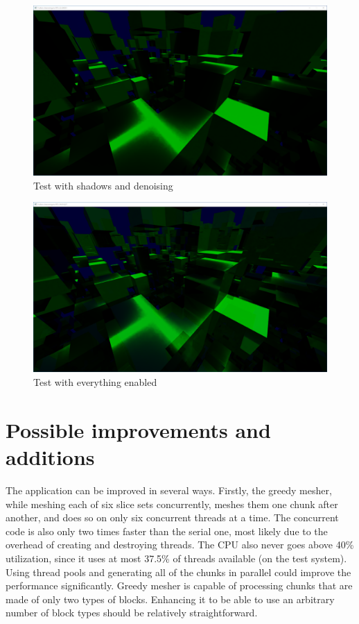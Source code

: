 \documentclass[times, utf8, zavrsni, numeric]{fer}
\begin{document}
\begin{center}
\begin{figure}[H]
\includegraphics[width=1\textwidth]{tests/shadows+denoising.png}
\caption{Test with shadows and denoising}
\end{figure}
\end{center}

\begin{center}
\begin{figure}[H]
\includegraphics[width=1\textwidth]{tests/all_on.png}
\caption{Test with everything enabled}
\label{image:all_on}
\end{figure}
\end{center}

\section{Possible improvements and additions}
The application can be improved in several ways. Firstly, the greedy mesher, while meshing each of six slice sets concurrently, meshes them one chunk after another, and does so on only six concurrent threads at a time. The concurrent code is also only two times faster than the serial one, most likely due to the overhead of creating and destroying threads. The CPU also never goes above 40\% utilization, since it uses at most 37.5\% of threads available (on the test system). Using thread pools and generating all of the chunks in parallel could improve the performance significantly.
Greedy mesher is capable of processing chunks that are made of only two types of blocks. Enhancing it to be able to use an arbitrary number of block types should be relatively straightforward.
\end{document}
